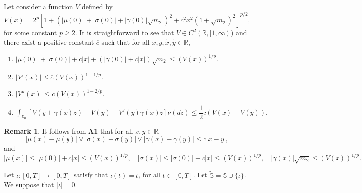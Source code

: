 \documentclass[11pt]{article}
\theoremstyle{theorem}
\theoremstyle{definition}
\newtheorem{Rem}[Def]{Remark}
\newcommand{\bR}{\mathbb{R}}
\newcommand{\1}{{\bf 1}}
\begin{document}
Let consider a function $V$ defined by 
$$V(x) =  2^{p} \left[ 1+ \left(|\mu(0)|+ |\sigma(0)|+ |\gamma(0)| \sqrt{m_2} \right)^2 + c^2 x^2 (1+\sqrt{m_2})^2 \right]^{p/2},$$
for some constant $p \geq 2$. 
It is straightforward to see that $V\in C^2(\mathbb{R}, [1, \infty))$ and there exist a positive constant $ \overline{c} $ such that for all $x, y, \widetilde{x}, \widetilde{y} \in \bR$,
\begin{enumerate}
\item[\bf A2.] $|\mu(0)|+|\sigma(0)|+c |x|+\left(|\gamma(0)|+c |x|\right) \sqrt{m_2} \leq \left(V(x)\right)^{1/p}.$
\item[\bf A3.] $|V'(x)| \leq \overline{c} \left(V(x)\right)^{1-1/p}.$
\item[\bf A4.] $|V''(x)| \leq \overline{c} \left(V(x)\right)^{1-2/p}.$
\item[\bf A5.]   
$\int_{\bR_0} \left[ V(y+\gamma(x)z)-V(y)-V'(y)\gamma(x)z\right] \nu (dz)  \le \dfrac{1}{2} \overline{c}  \left(V(x)+ V(y)\right).$
\end{enumerate} 
\begin{Rem} %
It follows from {\bf A1} that for all $x,y \in \mathbb{R}$, 
$$|\mu(x)-\mu(y)| \vee |\sigma(x) - \sigma(y)| \vee |\gamma(x) - \gamma(y)| \leq c|x-y|,$$
and 
$$|\mu(x)|\leq |\mu(0)|+c|x|\leq \left(V(x)\right)^{1/p}, \quad  |\sigma(x)| \leq |\sigma(0)|+c|x|\leq \left(V(x)\right)^{1/p}, \quad |\gamma(x)|\sqrt{m_2} \leq \left(V(x)\right)^{1/p}.$$ 
\label{Rem1}
\end{Rem}


Let $\iota :[0, T]\to [0, T]$ satisfy that $\iota(t)=t$, for all $t\in [0, T]$.  Let $\widetilde{\mathbb{S}} = \mathbb{S}\cup\{\iota \}$. We suppose that  $|\iota| =0$. 
\end{document}

